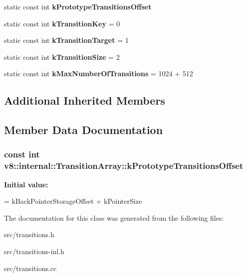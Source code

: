 \begin{DoxyCompactItemize}
\item 
static const int {\bfseries k\+Prototype\+Transitions\+Offset}
\item 
\hypertarget{classv8_1_1internal_1_1_transition_array_aeb8fa0752595521dcc2e975f98b00180}{}static const int {\bfseries k\+Transition\+Key} = 0\label{classv8_1_1internal_1_1_transition_array_aeb8fa0752595521dcc2e975f98b00180}

\item 
\hypertarget{classv8_1_1internal_1_1_transition_array_a8643d91e4814b315e7d6c695f9a47142}{}static const int {\bfseries k\+Transition\+Target} = 1\label{classv8_1_1internal_1_1_transition_array_a8643d91e4814b315e7d6c695f9a47142}

\item 
\hypertarget{classv8_1_1internal_1_1_transition_array_a70f4cab2687143d4e358a74001ce02ce}{}static const int {\bfseries k\+Transition\+Size} = 2\label{classv8_1_1internal_1_1_transition_array_a70f4cab2687143d4e358a74001ce02ce}

\item 
\hypertarget{classv8_1_1internal_1_1_transition_array_ae856479a42fb3a4de483e48a99c6cca1}{}static const int {\bfseries k\+Max\+Number\+Of\+Transitions} = 1024 + 512\label{classv8_1_1internal_1_1_transition_array_ae856479a42fb3a4de483e48a99c6cca1}

\end{DoxyCompactItemize}
\subsection*{Additional Inherited Members}


\subsection{Member Data Documentation}
\hypertarget{classv8_1_1internal_1_1_transition_array_ab3af8496b8919b7022a1b2db5dcc0707}{}
\subsubsection[{k\+Prototype\+Transitions\+Offset}]{\setlength{\rightskip}{0pt plus 5cm}const int v8\+::internal\+::\+Transition\+Array\+::k\+Prototype\+Transitions\+Offset\hspace{0.3cm}{\ttfamily [static]}}\label{classv8_1_1internal_1_1_transition_array_ab3af8496b8919b7022a1b2db5dcc0707}
{\bfseries Initial value\+:}
\begin{DoxyCode}
= kBackPointerStorageOffset +
                                                 kPointerSize
\end{DoxyCode}


The documentation for this class was generated from the following files\+:\begin{DoxyCompactItemize}
\item 
src/transitions.\+h\item 
src/transitions-\/inl.\+h\item 
src/transitions.\+cc\end{DoxyCompactItemize}
